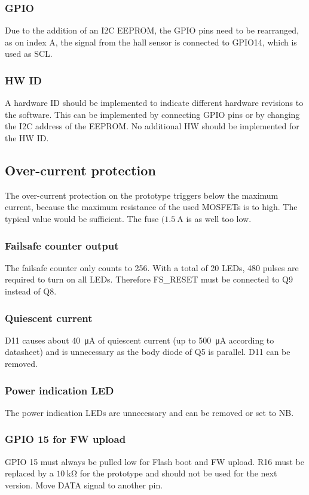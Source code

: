 \subsubsection{GPIO}
Due to the addition of an \ac{I2C} \ac{EEPROM}, the \ac{GPIO} pins need to be rearranged, as on index A, the signal from the hall sensor is connected to GPIO14, which is used as SCL. 

\subsubsection{HW ID}
A hardware ID should be implemented to indicate different hardware revisions to the software. This can be implemented by connecting GPIO pins or by changing the I2C address of the EEPROM. No additional HW should be implemented for the HW ID. 

\subsection{Over-current protection}
The over-current protection on the prototype triggers below the maximum current, because the maximum resistance of the used MOSFETs is to high. The typical value would be sufficient. The fuse $(\SI{1.5}{\A}$ is as well too low. 

\subsubsection{Failsafe counter output}
The failsafe counter only counts to 256. With a total of 20 \acp{LED}, 480 pulses are required to turn on all \acp{LED}. Therefore FS\_RESET must be connected to Q9 instead of Q8. 

\subsubsection{Quiescent current}
D11 causes about \SI{40}{\micro\ampere} of quiescent current (up to \SI{500}{\micro\ampere} according to datasheet) and is unnecessary as the body diode of Q5 is parallel. D11 can be removed. 

\subsubsection{Power indication LED}
The power indication \acp{LED} are unnecessary and can be removed or set to NB. 

\subsubsection{GPIO 15 for FW upload}
GPIO 15 must always be pulled low for Flash boot and FW upload. R16 must be replaced by a $\SI{10}{\kilo\ohm}$ for the prototype and should not be used for the next version. Move DATA signal to another pin. 

